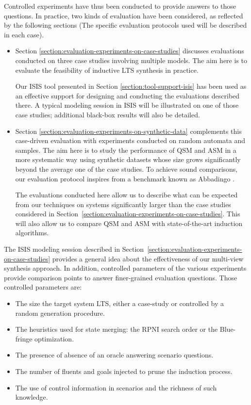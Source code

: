 Controlled experiments have thus been conducted to provide answers to those questions. In practice, two kinds of evaluation have been considered, as reflected by the following sections (The specific evaluation protocols used will be described in each case).
\begin{itemize}

\item Section \ref{section:evaluation-experiments-on-case-studies} discusses evaluations conducted on three case studies involving multiple models. The aim here is to evaluate the feasibility of inductive LTS synthesis in practice. 

Our ISIS tool presented in Section \ref{section:tool-support-isis} has been used as an effective support for designing and conducting the evaluations described there. A typical modeling session in ISIS will be illustrated on one of those case studies; additional black-box results will also be detailed.

\item Section \ref{section:evaluation-experiments-on-synthetic-data} complements this case-driven evaluation with experiments conducted on random automata and samples. The aim here is to study the performance of QSM and ASM in a more systematic way using synthetic datasets whose size grows significantly beyond the average one of the case studies. To achieve sound comparisons, our evaluation protocol inspires from a benchmark known as Abbadingo \cite{Lang:1998}.

The evaluations conducted here allow us to describe what can be expected from our techniques on systems significantly larger than the case studies considered in Section~\ref{section:evaluation-experiments-on-case-studies}. This will also allow us to compare QSM and ASM with state-of-the-art induction algorithms. 
\end{itemize}

The ISIS modeling session described in Section~\ref{section:evaluation-experiments-on-case-studies} provides a general idea about the effectiveness of our multi-view synthesis approach. In addition, controlled parameters of the various experiments provide comparison points to answer finer-grained evaluation questions. Those controlled parameters are:
\begin{itemize}
\item The size the target system LTS, either a case-study or controlled by a random generation procedure.
\item The heuristics used for state merging: the RPNI search order or the Blue-fringe optimization.
\item The presence of absence of an oracle answering scenario questions.
\item The number of fluents and goals injected to prune the induction process.
\item The use of control information in scenarios and the richness of such knowledge.
\end{itemize}

